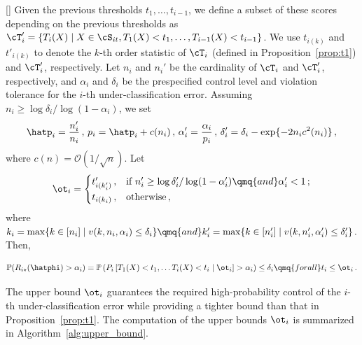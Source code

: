 \begin{theorem}\label{prop:ti}[\cite{wang2024hierarchical}]
Given the previous thresholds $t_1, \ldots, t_{i - 1}$, we define a subset of these scores depending on the previous thresholds as $\cT'_i = \{ T_i(X) \mid X \in \cS_{it},  T_1(X)< t_1, \ldots, T_{i - 1}(X)< t_{i - 1} \}$. We use $t_{i(k)}$ and  $t'_{i(k)}$ to denote the $k$-th order statistic of $\cT_i$ (defined in Proposition~\ref{prop:t1}) and $\cT'_i$, respectively. Let  $n_i$ and $n_i'$ be the cardinality of $\cT_i$ and $\cT'_i$, respectively, and $\alpha_i$ and $\delta_i$ be the prespecified control level and violation tolerance for the $i$-th {under-classification} error.
Assuming $n_i \geq \log \delta_i/ \log (1 - \alpha_i)$,  we set 
\begin{equation*}\label{eq:adjustment}
\hatp_i = \frac{n_i'}{n_i}\,,\,  p_i =  \hatp_i + c(n_i)\,,\, \alpha_i' = \frac{\alpha_i}{p_i}\,,\, \delta_i' = \delta_i - \exp\{- 2n_i c^2(n_i)\}\,,  
\end{equation*}
where $c(n) = \mathcal{O}(1/\sqrt{n})$. Let
\begin{equation*}\label{eq:threshold_2}
\ot_i = \begin{cases}  t'_{i(k'_i)}\,, & \mbox{if } n_i' \geq \log \delta_i'/ \log (1 - \alpha_i') \qmq{and} \alpha_i' < 1\,; \\
t_{i(k_i)}\,, &\mbox{otherwise}\,,
\end{cases}
\end{equation*}
where $k_i = \max \{k\in[n_i] \mid v(k,n_i,\alpha_i) \leq \delta_i\} \qmq{and} 
    k'_i = \max \{k\in[n_i'] \mid v(k,n'_i,\alpha'_i)\leq \delta_i'\}\,.$ Then,


\begin{equation*}\label{eq:control_2}
\mathbb{P}(R_{i\star}( \hatphi)  > \alpha_i) =\mathbb{P}\left( P_i\left[T_{1} (X)< t_1, \ldots T_i (X)< t_i \mid \ot_i \right] > \alpha_i \right) \leq \delta_i \qmq{for all} t_i \leq \ot_i\,.    
\end{equation*}
\end{theorem}
The upper bound \(\ot_i\) guarantees the required high-probability control of the \(i\)-th under-classification error while providing a tighter bound than that in Proposition~\ref{prop:t1}. The computation of the upper bounds \(\ot_i\) is summarized in Algorithm~\ref{alg:upper_bound}.


